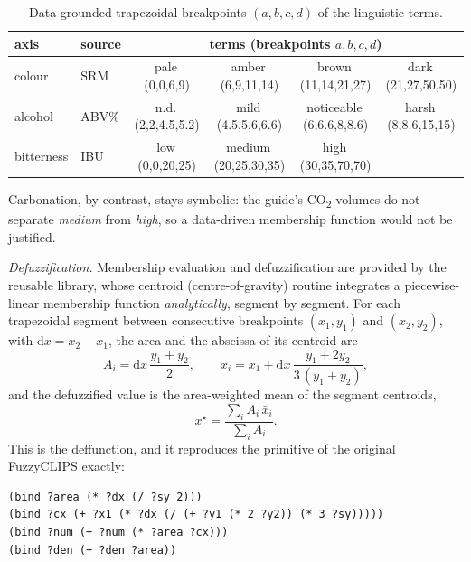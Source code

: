 \begin{table}[ht]
\centering\small
\caption{Data-grounded trapezoidal breakpoints $(a,b,c,d)$ of the linguistic
terms.}\label{tab:trapezoids}
\begin{tabular}{llcccc}
\toprule
axis & source & \multicolumn{4}{c}{terms (breakpoints $a,b,c,d$)}\\
\midrule
colour & SRM & pale\,(0,0,6,9) & amber\,(6,9,11,14) & brown\,(11,14,21,27) & dark\,(21,27,50,50)\\
alcohol & ABV\% & n.d.\,(2,2,4.5,5.2) & mild\,(4.5,5,6,6.6) & noticeable\,(6,6.6,8,8.6) & harsh\,(8,8.6,15,15)\\
bitterness & IBU & low\,(0,0,20,25) & medium\,(20,25,30,35) & high\,(30,35,70,70) &\\
\bottomrule
\end{tabular}
\end{table}

Carbonation, by contrast, stays symbolic: the guide's CO\textsubscript{2} volumes
do not separate \emph{medium} from \emph{high}, so a data-driven membership
function would not be justified.

\emph{Defuzzification.} Membership evaluation and defuzzification are provided by
the reusable  library, whose centroid (centre-of-gravity)
routine integrates a piecewise-linear membership function \emph{analytically},
segment by segment. For each trapezoidal segment between consecutive breakpoints
$(x_1,y_1)$ and $(x_2,y_2)$, with $\mathrm dx=x_2-x_1$, the area and the abscissa
of its centroid are
\begin{equation}
A_i=\mathrm dx\,\frac{y_1+y_2}{2},\qquad
\bar x_i=x_1+\mathrm dx\,\frac{y_1+2y_2}{3\,(y_1+y_2)},
\label{eq:segcentroid}
\end{equation}
and the defuzzified value is the area-weighted mean of the segment centroids,
\begin{equation}
x^\star=\frac{\sum_i A_i\,\bar x_i}{\sum_i A_i}.
\label{eq:centroid}
\end{equation}
This is the  deffunction, and it reproduces the
 primitive of the original FuzzyCLIPS exactly:

\begin{lstlisting}
(bind ?area (* ?dx (/ ?sy 2)))
(bind ?cx (+ ?x1 (* ?dx (/ (+ ?y1 (* 2 ?y2)) (* 3 ?sy)))))
(bind ?num (+ ?num (* ?area ?cx)))
(bind ?den (+ ?den ?area))
\end{lstlisting}

